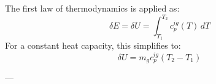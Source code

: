 The first law of thermodynamics is applied as:  
\[
\delta E = \delta U = \int_{T_1}^{T_2} c_p^{ig}(T) \, dT
\]  
For a constant heat capacity, this simplifies to:  
\[
\delta U = m_g c_p^{ig} (T_2 - T_1)
\]  

---